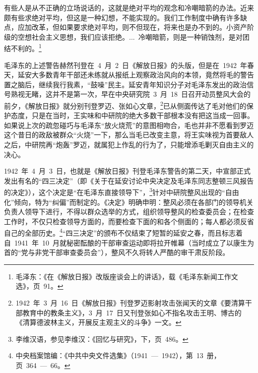 \begin{quoting}
有些人是从不正确的立场说话的，这就是绝对平均的观念和冷嘲暗箭的办法。近来颇有些求绝对平均，但这是一种幻想，不能实现的。我们工作制度中确有许多缺点，应加改革，但如果要求绝对平均，则不但现在，将来也是办不到的。小资产阶级的空想社会主义思想，我们应该拒绝。...~冷嘲暗箭，则是一种销蚀剂，是对团结不利的。\footnote{毛泽东：《在《解放日报》改版座谈会上的讲话》，载《毛泽东新闻工作文选》，页~91。}
\end{quoting}毛泽东的上述警告赫然刊登在~4~月~2~日《解放日报》的头版，但是在~1942~年春天，延安大多数青年干部还未练就从报纸上观察政治风向的本领，竟然将毛的警告置之脑后，继续我行我素，“鼓噪”民主。延安青年知识分子对毛泽东发出的政治信号熟视无睹，这并不是第一次，早在中央研究院~3~月~18~日召开动员整风大会的前夕，《解放日报》就分别刊登罗迈、张如心文章，\footnote{1942~年~3~月~16~日《解放日报》刊登罗迈影射攻击张闻天的文章《要清算干部教育中的教条主义》，3~月~17~日又刊登张如心不指名攻击王明、博古的《清算德波林主义，开展反主观主义的斗争》一文。}已从侧面传达了毛对他们的保护态度，只是在当时，王实味和中研院的绝大多数干部根本没有把这当成一回事。如果说上次的疏忽碰巧与毛泽东“放火烧荒”的意图相吻合，毛也并非不愿看到罗迈这个昔日的政敌被群众“火烧”一下，那么当毛已改变主意，将王实味视为首要敌人之后，中研院再“炮轰”罗迈，就属犯上作乱的行为了，只能增添毛剿灭自由主义的决心。

1942~年~4~月~3~日，也就是《解放日报》刊登毛泽东警告的第二天，中宣部正式发出有名的“四三决定”（即《关于在延安讨论中央决定及毛泽东同志整顿三风报告的决定》），这个决定是“在毛泽东直接领导下”，\footnote{李维汉语，参见李维汉：《回忆与研究》，下，页~486。}针对中研院整风出现的“自由化”倾向，特为“纠偏”而制定的。《决定》明确申明：整风必须在各部门的领导机关负责人领导下进行，不得以群众选举的方式，组织领导整风的检查委员会；在检查工作时，不仅只检查领导方面的，而要检查下面的和各个侧面的；每人都必须反省自己的全部历史。\footnote{中央档案馆编：《中共中央文件选集》（1941~—~1942），第~13~册，页~364~—~66。}“四三决定”的颁布不仅结束了短暂的延安之春，而且标志着自~1941~年~10~月就秘密酝酿的干部审查运动即将拉开帷幕（当时成立了以康生为首的“党与非党干部审查委员会”），整风不久将转人严酷的审干肃反阶段。

